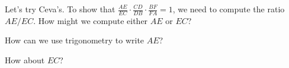




Let's try Ceva's. To show that $\frac{AE}{EC}\cdot \frac{CD}{DB}\cdot \frac{BF}{FA} = 1$, we need to compute the ratio $AE/EC$. How might we compute either $AE$ or $EC$?


How can we use trigonometry to write $AE$?







How about $EC$?







